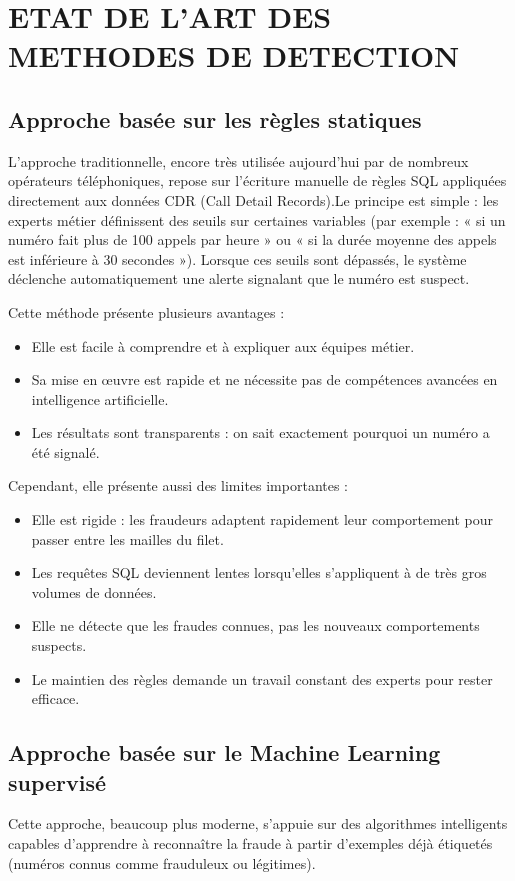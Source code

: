 \documentclass[12pt, oneside, a4paper]{report}
\begin{document}
\section{ETAT DE L'ART DES METHODES DE DETECTION}

\subsection{Approche basée sur les règles statiques}
L'approche traditionnelle, encore très utilisée aujourd'hui par de nombreux opérateurs téléphoniques, repose sur l'écriture manuelle de règles SQL appliquées directement aux données CDR (Call Detail Records).Le principe est simple : les experts métier définissent des seuils sur certaines variables (par exemple : « si un numéro fait plus de 100 appels par heure » ou « si la durée moyenne des appels est inférieure à 30 secondes »). Lorsque ces seuils sont dépassés, le système déclenche automatiquement une alerte signalant que le numéro est suspect.

Cette méthode présente plusieurs avantages :
\begin{itemize}
\item Elle est facile à comprendre et à expliquer aux équipes métier.
\item Sa mise en œuvre est rapide et ne nécessite pas de compétences avancées en          \vspace{0.3cm}intelligence artificielle.
\item Les résultats sont transparents : on sait exactement pourquoi un numéro a été signalé.
\end{itemize}

Cependant, elle présente aussi des limites importantes :
\begin{itemize}
\item Elle est rigide : les fraudeurs adaptent rapidement leur comportement pour passer entre les mailles du filet.
\item Les requêtes SQL deviennent lentes lorsqu'elles s'appliquent à de très gros volumes de données.
\item Elle ne détecte que les fraudes connues, pas les nouveaux comportements suspects.
\item Le maintien des règles demande un travail constant des experts pour rester efficace.
\end{itemize}

\subsection{Approche basée sur le Machine Learning supervisé}
Cette approche, beaucoup plus moderne, s'appuie sur des algorithmes intelligents capables d'apprendre à reconnaître la fraude à partir d'exemples déjà étiquetés (numéros connus comme frauduleux ou légitimes).
\end{document}
